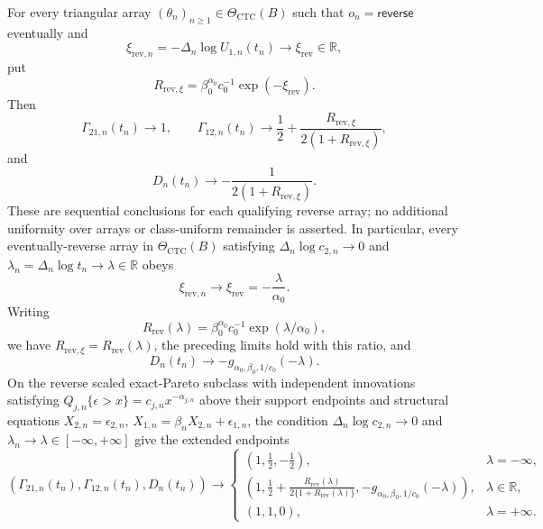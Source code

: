 For every triangular array \((\theta_n)_{n\geq1}\in\Theta_{\mathrm{CTC}}(B)\) such that \(o_n=\mathsf{reverse}\) eventually and
\[
\xi_{\mathrm{rev},n}=-\Delta_n\log U_{1,n}(t_n)
\longrightarrow\xi_{\mathrm{rev}}\in\mathbb R,
\]
put
\[
R_{\mathrm{rev},\xi}
=\beta_0^{\alpha_0}c_0^{-1}\exp(-\xi_{\mathrm{rev}}).
\]
Then
\[
\Gamma_{21,n}(t_n)\longrightarrow1,
\qquad
\Gamma_{12,n}(t_n)\longrightarrow
\frac12+\frac{R_{\mathrm{rev},\xi}}{2(1+R_{\mathrm{rev},\xi})},
\]
and
\[
D_n(t_n)\longrightarrow-\frac{1}{2(1+R_{\mathrm{rev},\xi})}.
\]
These are sequential conclusions for each qualifying reverse array; no additional uniformity over arrays or class-uniform remainder is asserted. In particular, every eventually-reverse array in \(\Theta_{\mathrm{CTC}}(B)\) satisfying \(\Delta_n\log c_{2,n}\to0\) and \(\lambda_n=\Delta_n\log t_n\to\lambda\in\mathbb R\) obeys
\[
\xi_{\mathrm{rev},n}\longrightarrow\xi_{\mathrm{rev}}=-\frac{\lambda}{\alpha_0}.
\]
Writing
\[
R_{\mathrm{rev}}(\lambda)
=\beta_0^{\alpha_0}c_0^{-1}\exp(\lambda/\alpha_0),
\]
we have \(R_{\mathrm{rev},\xi}=R_{\mathrm{rev}}(\lambda)\), the preceding limits hold with this ratio, and
\[
D_n(t_n)\longrightarrow
-g_{\alpha_0,\beta_0,1/c_0}(-\lambda).
\]
On the reverse scaled exact-Pareto subclass with independent innovations satisfying \(Q_{j,n}\{\epsilon>x\}=c_{j,n}x^{-\alpha_{j,n}}\) above their support endpoints and structural equations \(X_{2,n}=\epsilon_{2,n}\), \(X_{1,n}=\beta_nX_{2,n}+\epsilon_{1,n}\), the condition \(\Delta_n\log c_{2,n}\to0\) and \(\lambda_n\to\lambda\in[-\infty,+\infty]\) give the extended endpoints
\[
(\Gamma_{21,n}(t_n),\Gamma_{12,n}(t_n),D_n(t_n))\longrightarrow
\begin{cases}
(1,\frac12,-\frac12), & \lambda=-\infty,\\
\left(1,\frac12+\frac{R_{\mathrm{rev}}(\lambda)}{2\{1+R_{\mathrm{rev}}(\lambda)\}},-g_{\alpha_0,\beta_0,1/c_0}(-\lambda)\right), & \lambda\in\mathbb R,\\
(1,1,0), & \lambda=+\infty.
\end{cases}
\]